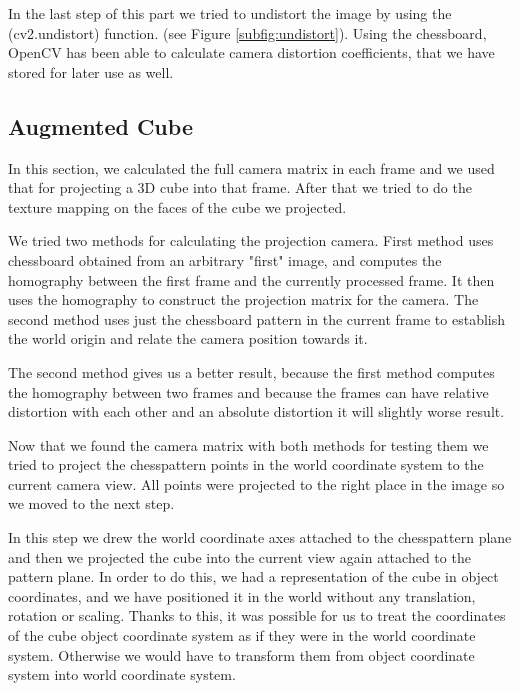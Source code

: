 In the last step of this part we tried to undistort the image by using the (cv2.undistort) function. (see Figure \ref{subfig:undistort}). Using the chessboard, OpenCV has been able to calculate camera distortion coefficients, that we have stored for later use as well.

\subsection{Augmented Cube}
In this section, we calculated the full camera matrix in each frame and we used that for projecting a 3D cube into that frame. After that we tried to do the texture mapping on the faces of the cube we projected.

We tried two methods for calculating the projection camera. First method uses chessboard obtained from an arbitrary "first" image, and computes the homography between the first frame and the currently processed frame. It then uses the homography to construct the projection matrix for the camera. The second method uses just the chessboard pattern in the current frame to establish the world origin and relate the camera position towards it.

The second method gives us a better result, because the first method computes the homography between two frames and because the frames can have relative distortion with each other and an absolute distortion it will slightly worse result.

Now that we found the camera matrix with both methods for testing them we tried to project the chesspattern points in the world coordinate system to the current camera view. All points were projected to the right place in the image so we moved to the next step.

In this step we drew the world coordinate axes attached to the chesspattern plane and then we projected the cube into the current view again attached to the pattern plane. In order to do this, we had a representation of the cube in object coordinates, and we have positioned it in the world without any translation, rotation or scaling. Thanks to this, it was possible for us to treat the coordinates of the cube object coordinate system as if they were in the world coordinate system. Otherwise we would have to transform them from object coordinate system into world coordinate system.

